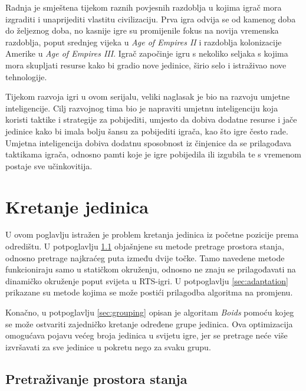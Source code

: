 \documentclass[times, utf8, zavrsni, numeric]{fer}
\begin{document}
\par Radnja je smještena tijekom raznih povjesnih razdoblja u kojima igrač mora izgraditi i unaprijediti vlastitu civilizaciju.
Prva igra odvija se od kamenog doba do željeznog doba, no kasnije igre su promijenile fokus na novija vremenska razdoblja, poput srednjeg vijeka u \textit{Age of Empires II} i razdoblja kolonizacije Amerike u \textit{Age of Empires III}.
Igrač započinje igru s nekoliko seljaka s kojima mora skupljati resurse kako bi gradio nove jedinice, širio selo i istraživao nove tehnologije.

\par Tijekom razvoja igri u ovom serijalu, veliki naglasak je bio na razvoju umjetne inteligencije.
Cilj razvojnog tima bio je napraviti umjetnu inteligenciju koja koristi taktike i strategije za pobijediti, umjesto da dobiva dodatne resurse i jače jedinice kako bi imala bolju šansu za pobijediti igrača, kao što igre često rade.
Umjetna inteligencija dobiva dodatnu sposobnost iz činjenice da se prilagođava taktikama igrača, odnosno pamti koje je igre pobijedila ili izgubila te s vremenom postaje sve učinkovitija.  

\chapter{Kretanje jedinica}\label{ch:pathfinding}

\par U ovom poglavlju istražen je problem kretanja jedinica iz početne pozicije prema odredištu. 
U potpoglavlju \ref{sec:stateSearch} objašnjene su metode pretrage prostora stanja, odnosno pretrage najkraćeg puta između dvije točke.
Tamo navedene metode funkcioniraju samo u statičkom okruženju, odnosno ne znaju se prilagođavati na dinamičko okruženje poput svijeta u RTS-igri.
U potpoglavlju \ref{sec:adaptation} prikazane su metode kojima se može postići prilagodba algoritma na promjenu.

\par Konačno, u potpoglavlju \ref{sec:grouping} opisan je algoritam \textit{Boids} pomoću kojeg se može ostvariti zajedničko kretanje određene grupe jedinica.
Ova optimizacija omogućava pojavu većeg broja jedinica u svijetu igre, jer se pretrage neće više izvršavati za sve jedinice u pokretu nego za svaku grupu.

\section{Pretraživanje prostora stanja}\label{sec:stateSearch}
\end{document}
